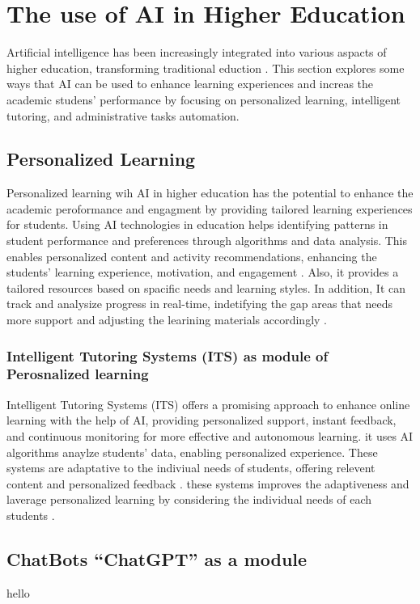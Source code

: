 \section{The use of AI in Higher Education }\label{use-ai}
\justifying
Artificial intelligence has been increasingly integrated into various aspacts of higher
education, transforming traditional eduction \citep{wang_exploring_2023}. This section explores
some ways that AI can be used to enhance learning experiences and increas the academic studens' performance
by focusing on  personalized learning, intelligent tutoring, and administrative tasks automation.

\subsection{Personalized Learning}
Personalized learning wih AI in higher education has the potential to enhance the academic peroformance and engagment
by providing tailored learning experiences for students. Using AI technologies in education helps identifying patterns in student performance and preferences 
through algorithms and data analysis. This enables personalized content and activity recommendations, enhancing the students' 
learning experience, motivation, and engagement \citep{guerrero-quinonez_artificial_2023}. Also, it provides a tailored resources based on spacific 
needs and learning styles. In addition, It can track and analysize progress in real-time, indetifying the gap areas that needs more support and adjusting the learining
materials accordingly \citep{l_d_of_cs_akshara_first_grade_college_2023}.

\subsubsection{Intelligent Tutoring Systems (ITS) as module of Perosnalized learning}
Intelligent Tutoring Systems (ITS) offers a promising approach to enhance online learning
with the help of AI, providing personalized support, instant feedback, 
and continuous monitoring for more effective and autonomous learning. it uses AI algorithms anaylze students' data,
enabling personalized experience. These systems are adaptative to the indiviual needs of students,
offering relevent content and personalized feedback \citep{l_d_of_cs_akshara_first_grade_college_2023}. these
systems improves the adaptiveness and laverage personalized learning by considering the individual needs of 
each students \citep{bradac_design_2022}.
\subsection{ChatBots ``ChatGPT'' as a module}
hello
